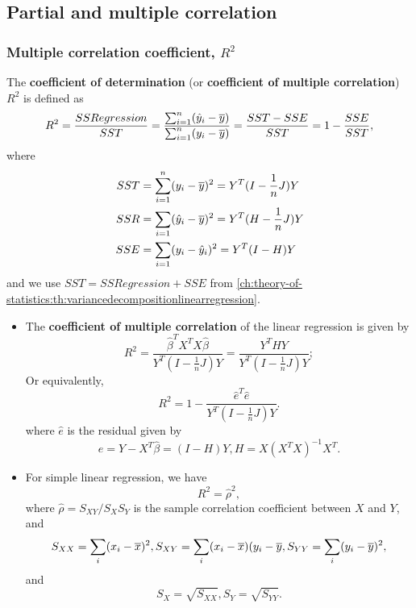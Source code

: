 \begin{refsection}
\subsection{Partial and multiple correlation}

\subsubsection{Multiple correlation coefficient, $R^2$}

\begin{definition}
	The \textbf{coefficient of determination} (or \textbf{coefficient of multiple correlation}) $R^2$ is defined as 
	$$R^2 = \frac{SSRegression}{SST} = \frac{\sum_{i=1}^n (\hat{y}_i - \overline{y})}{\sum_{i=1}^n (y_i - \overline{y})} = \frac{SST - SSE}{SST} = 1 -\frac{SSE}{SST},$$
where	
\begin{align*}
SST &= \sum_{i=1}^{n} (y_i - \overline{y})^2 = Y^T(I-\frac{1}{n}J)Y\\
SSR &= \sum_{i=1} (\hat{y}_i - \overline{y})^2 = Y^T(H - \frac{1}{n}J)Y\\
SSE&= \sum_{i=1} (y_i - \hat{y}_i)^2 = Y^T(I - H)Y
\end{align*}
and we use $SST = SSRegression + SSE$ from \autoref{ch:theory-of-statistics:th:variancedecompositionlinearregression}. 
\end{definition}


\begin{theorem}\cite[164]{theil1971principles}\label{ch:regression-analysis:th:PropertiesLinearRegressionCoefficientMultipleCorrelation}\hfill
\begin{itemize}
	\item The \textbf{coefficient of multiple correlation} of the linear regression is given by
	$$R^2 = \frac{\hat{\beta}^T X^TX \hat{\beta}}{Y^T(I - \frac{1}{n}J)Y} =\frac{Y^THY}{Y^T(I - \frac{1}{n}J)Y};$$
	Or equivalently,  $$R^2 = 1-\frac{\hat{e}^T\hat{e}}{Y^T(I - \frac{1}{n}J)Y}.$$
	where $\hat{e}$ is the residual given by
	$$\hat{e} = Y - X^T\hat{\beta} = (I - H)Y,H = X(X^TX)^{-1}X^T.$$
	\item For simple linear regression, we have
	$$R^2 = \hat{\rho}^2,$$
	where $\hat{\rho} = S_{XY}/S_XS_Y$ is the sample correlation coefficient between $X$ and $Y$, and 
	$$S_{XX} = \sum_i (x_{i}-\overline{x})^2, S_{XY} =  \sum_i (x_{i}-\overline{x})(y_i - \overline{y}, S_{YY} = \sum_i (y_{i}-\overline{y})^2,$$
			and
			$$S_{X} = \sqrt{S_{XX}}, S_Y = \sqrt{S_{YY}}.$$
\end{itemize}	
	

\end{theorem}
\end{refsection}
